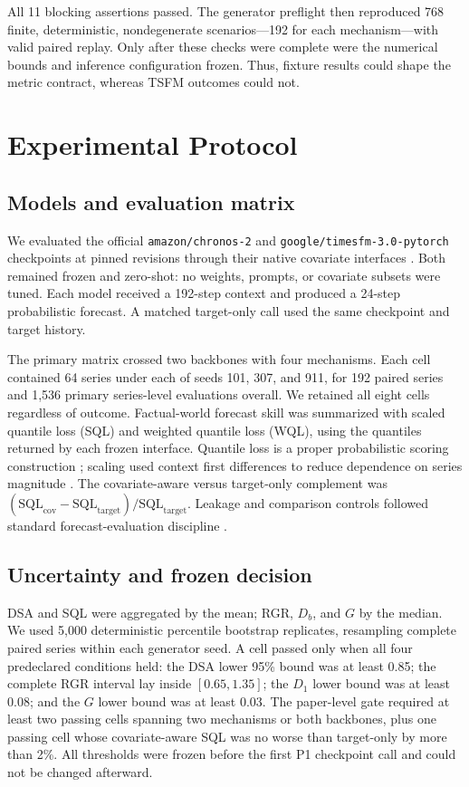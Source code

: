 \documentclass[conference]{IEEEtran}
\begin{document}
All 11 blocking assertions passed. The generator preflight then reproduced 768 finite,
deterministic, nondegenerate scenarios---192 for each mechanism---with valid paired
replay. Only after these checks were complete were the numerical bounds and inference
configuration frozen. Thus, fixture results could shape the metric contract, whereas
TSFM outcomes could not.

\section{Experimental Protocol}
\subsection{Models and evaluation matrix}

We evaluated the official \texttt{amazon/chronos-2} and
\texttt{google/timesfm-3.0-pytorch} checkpoints at pinned revisions through their
native covariate interfaces \cite{ansari2025chronos2,jain2026timesfm3}. Both remained
frozen and zero-shot: no weights, prompts, or covariate subsets were tuned. Each model
received a 192-step context and produced a 24-step probabilistic forecast. A matched
target-only call used the same checkpoint and target history.

The primary matrix crossed two backbones with four mechanisms. Each cell contained 64
series under each of seeds 101, 307, and 911, for 192 paired series and 1,536 primary
series-level evaluations overall. We retained all eight cells regardless of outcome.
Factual-world forecast skill was summarized with scaled quantile loss (SQL) and
weighted quantile loss (WQL), using the quantiles returned by each frozen interface.
Quantile loss is a proper probabilistic scoring construction
\cite{gneiting2007proper}; scaling used context first differences to reduce dependence
on series magnitude \cite{hyndman2006accuracy}. The covariate-aware versus target-only
complement was
$(\mathrm{SQL}_{\mathrm{cov}}-\mathrm{SQL}_{\mathrm{target}})/
\mathrm{SQL}_{\mathrm{target}}$. Leakage and comparison controls followed standard
forecast-evaluation discipline \cite{hewamalage2023evaluation}.

\subsection{Uncertainty and frozen decision}

DSA and SQL were aggregated by the mean; RGR, $D_b$, and $G$ by the median. We used
5,000 deterministic percentile bootstrap replicates, resampling complete paired series
within each generator seed. A cell passed only when all four predeclared conditions
held: the DSA lower 95\% bound was at least 0.85; the complete RGR interval lay inside
$[0.65,1.35]$; the $D_1$ lower bound was at least 0.08; and the $G$ lower bound was at
least 0.03. The paper-level gate required at least two passing cells spanning two
mechanisms or both backbones, plus one passing cell whose covariate-aware SQL was no
worse than target-only by more than 2\%. All thresholds were frozen before the first
P1 checkpoint call and could not be changed afterward.
\end{document}
